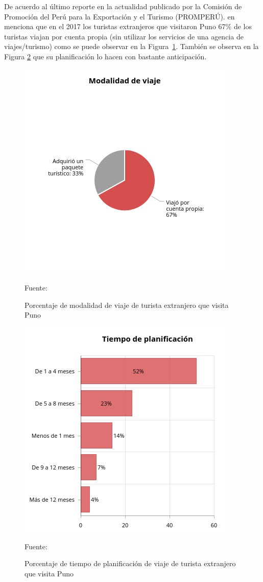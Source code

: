 De acuerdo al último reporte en la actualidad publicado por la Comisión de Promoción del Perú para la Exportación y el Turismo (PROMPERÚ). en  menciona que en el 2017 los turistas extranjeros que visitaron Puno 67\% de los turistas viajan por cuenta propia (sin utilizar los servicios de una agencia de viajes/turismo) como se puede observar en la Figura~\ref{fig:modalidad_viaje_extrajero}. También se observa en la Figura \ref{fig:tiempo_planificacion_extranjero} que su planificación lo hacen con bastante anticipación.
\begin{figure}[!ht]
    \centering
    \includegraphics[scale=0.7]{Capitulo2/Figs/modalidad_viaje_extrajero.jpg}
    \caption{Porcentaje de modalidad de viaje de turista extranjero que visita Puno}
    Fuente: 
    \label{fig:modalidad_viaje_extrajero}
\end{figure}

\begin{figure}[!ht]
    \centering
    \includegraphics[scale=0.7]{Capitulo2/Figs/tiempo_planificacion_extranjero.jpg}
    \caption{Porcentaje de tiempo de planificación de viaje de turista extranjero que visita Puno}
    Fuente: 
    \label{fig:tiempo_planificacion_extranjero}
\end{figure}

